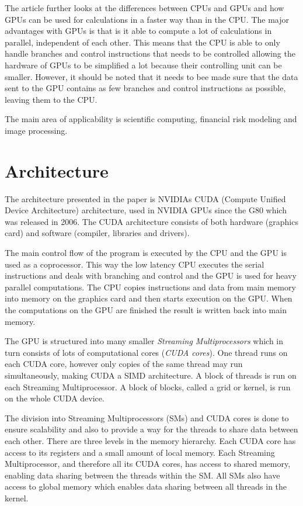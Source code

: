 \documentclass[titlepage, a4paper]{article}
\begin{document}
The article further looks at the differences between CPUs and GPUs and how GPUs can be used for calculations in a faster way than in the CPU. The major advantages with GPUs is that is it able to compute a lot of calculations in parallel, independent of each other. This means that the CPU is able to only handle branches and control instructions that needs to be controlled allowing the hardware of GPUs to be simplified a lot because their controlling unit can be smaller. However, it should be noted that it needs to bee made sure that the data sent to the GPU contains as few branches and control instructions as possible, leaving them to the CPU. 

The main area of applicability is scientific computing, financial risk modeling and image processing.

\section{Architecture}\label{sec:arch}
The architecture presented in the paper is NVIDIAs CUDA (Compute Unified Device Architecture) architecture, used in NVIDIA GPUs since the G80 which was released in 2006. The CUDA architecture consists of both hardware (graphics card) and software (compiler, libraries and drivers).

The main control flow of the program is executed by the CPU and the GPU is used as a coprocessor. This way the low latency CPU executes the serial instructions and deals with branching and control and the GPU is used for heavy parallel computations. The CPU copies instructions and data from main memory into memory on the graphics card and then starts execution on the GPU. When the computations on the GPU are finished the result is written back into main memory.

The GPU is structured into many smaller \textit{Streaming Multiprocessors} which in turn consists of lots of computational cores (\textit{CUDA cores}). One thread runs on each CUDA core, however only copies of the same thread may run simultaneously, making CUDA a SIMD architecture. A block of threads is run on each Streaming Multiprocessor. A block of blocks, called a grid or kernel, is run on the whole CUDA device.

The division into Streaming Multiprocessors (SMs) and CUDA cores is done to ensure scalability and also to provide a way for the threads to share data between each other. There are three levels in the memory hierarchy. Each CUDA core has access to its registers and a small amount of local memory. Each Streaming Multiprocessor, and therefore all its CUDA cores, has access to shared memory, enabling data sharing between the threads within the SM. All SMs also have access to global memory which enables data sharing between all threads in the kernel.
\end{document}
